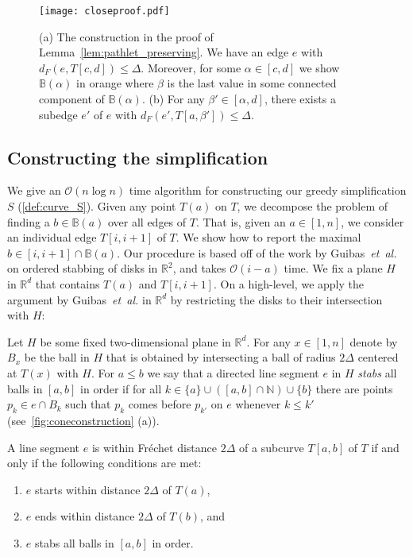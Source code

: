 \documentclass[a4paper,UKenglish,cleveref,thm-restate,notab]{lipics-v2021}
\makeatletter
\newcommand{\etal}{\textit{et~al.\@}\xspace}
\newcommand{\f}{Fr\'echet\xspace}
\newcommand{\dF}{\ensuremath{d_F}}
\newcommand{\bigO}{\mathcal{O}}
\newcommand{\R}{\mathbb{R}}
\newcommand{\N}{\mathbb{N}}
\newcommand{\B}{\mathbb{B}}
\makeatother
\begin{document}
    \begin{figure}[h]
        \centering
        \texttt{[image: closeproof.pdf]}
        \caption{(a) The construction in the proof of Lemma~\ref{lem:pathlet_preserving}.
        We have an edge $e$ with $\dF(e, T[c, d]) \leq \Delta$. Moreover, for some $\alpha \in [c, d]$ we show $\B(\alpha)$ in orange where $\beta$ is the last value in some connected component of $\B(\alpha)$. (b) For any $\beta' \in [\alpha, d]$, there exists a subedge $e'$ of $e$ with $\dF(e', T[a, \beta']) \leq \Delta$.  }
        \label{fig:closeproof}
    \end{figure}
        
\subsection{Constructing the simplification}
        
    We give an $\bigO(n \log n)$ time algorithm for constructing our greedy simplification $S$ (\cref{def:curve_S}).
    Given any point $T(a)$ on $T$, we decompose the problem of finding a $b \in \B(a)$ over all edges of $T$.
    That is, given an $a \in [1, n]$, we consider an individual edge $T[i, i+1]$ of $T$. 
    We show how to report the maximal $b \in [i, i+1] \cap \B(a)$.
    Our procedure is based off of the work by Guibas~\etal~\cite{guibas93minimum_link} on ordered stabbing of disks in $\mathbb{R}^2$, and takes $\bigO(i-a)$ time.
    We fix a plane $H$ in $\R^d$ that contains $T(a)$ and $T[i, i+1]$. 
    On a high-level, we apply the argument by Guibas~\etal in $\R^d$ by restricting the disks to their intersection with $H$: 
    
    \begin{definition}
        Let $H$ be some fixed two-dimensional plane in $\R^d$. 
        For any $x \in [1, n]$ denote by $B_x$ be the ball in $H$ that is obtained by intersecting a ball of radius $2\Delta$ centered at $T(x)$ with $H$.
        For $a \leq b$ we say that a directed line segment $e$ in $H$ \emph{stabs} all balls in $[a, b]$ in order if for all $k \in \{a\} \cup ([a, b] \cap \N) \cup \{b\}$ there are points $p_k \in e \cap B_k$ such that $p_k$ comes before $p_{k'}$ on $e$ whenever $k \leq k'$ (see~\cref{fig:coneconstruction} (a)). 
    \end{definition}
    
    \begin{lemma}
        \label{lem:categorization}
        A line segment $e$ is within \f distance $2\Delta$ of a subcurve $T[a, b]$ of $T$ if and only if the following conditions are met:
        \begin{enumerate}
            \item $e$ starts within distance $2\Delta$ of $T(a)$,
            \item $e$ ends within distance $2\Delta$ of $T(b)$, and
            \item $e$ stabs all balls in $[a, b]$ in order. 
        \end{enumerate}
    \end{lemma}        
        
\end{document}
